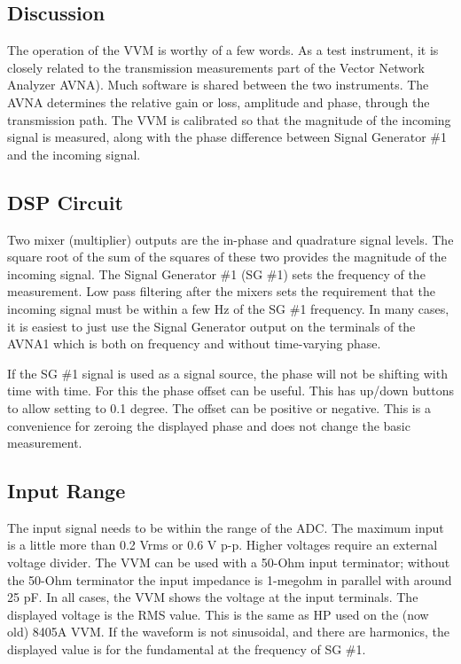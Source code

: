 \subsection{Discussion}
\label{subsect:VVMDiscus}
The operation of the VVM is worthy of a few words. As a test instrument, it is closely related to the transmission measurements part of the Vector Network Analyzer AVNA). Much software is shared between the two instruments. The AVNA determines the relative gain or loss, amplitude and phase, through the transmission path. The VVM is calibrated so that the magnitude of the incoming signal is measured, along with the phase difference between Signal Generator \#1 and the incoming signal.

\subsection{DSP Circuit} Two mixer (multiplier) outputs are the in-phase and quadrature signal levels. The square root of the sum of the squares of these two provides the magnitude of the incoming signal. The Signal Generator \#1 (SG \#1) sets the frequency of the measurement. Low pass filtering after the mixers sets the requirement that the incoming signal must be within a few Hz of the SG \#1 frequency. In many cases, it is easiest to just use the Signal Generator output on the  terminals of the AVNA1 which is both on frequency and without time-varying phase.

If the SG \#1 signal is used as a signal source, the phase will not be shifting with time with time. For this the phase offset can be useful. This has up/down buttons to allow setting to 0.1 degree. The offset can be positive or negative. This is a convenience for zeroing the displayed phase and does not change the basic measurement.

\subsection{Input Range} The input signal needs to be within the range of the ADC. The maximum input is a little more than 0.2 Vrms or 0.6 V p-p.  Higher voltages require an external voltage divider.  The VVM can be used with a 50-Ohm input terminator; without the 50-Ohm terminator the input impedance is 1-megohm in parallel with around 25 pF.  In all cases, the VVM shows the voltage at the  input terminals.  The displayed voltage is the RMS value.  This is the same as HP used on the (now  old) 8405A VVM.   If the waveform is not sinusoidal, and there are harmonics, the displayed value is for the fundamental at the frequency of SG \#1.

